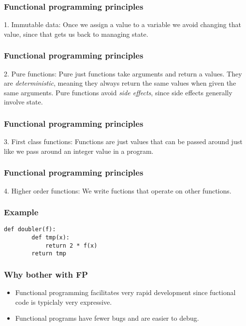 \documentclass[10pt]{beamer}
\begin{document}
\begin{frame}
  \frametitle{Functional programming principles}

   1.  Immutable data:  Once we assign a value to a variable we avoid 
   changing that value, since that gets us back to managing state.
\end{frame}
\begin{frame}
  \frametitle{Functional programming principles}

   2. Pure functions:  Pure just functions take arguments and return a values. 
   They are \emph{deterministic}, meaning they always return the same values when 
   given the same arguments.  Pure functions avoid \emph{side effects}, since
   side effects generally involve state.
\end{frame}
\begin{frame}
  \frametitle{Functional programming principles}

   3.  First class functions: Functions are just values that can be passed around 
   just like we pass around an integer value in a program.
\end{frame}
\begin{frame}
  \frametitle{Functional programming principles}

   4.  Higher order functions: We write fuctions that operate on other 
   functions.
\end{frame}
\begin{frame}[fragile]
  \frametitle{Example}

 
\begin{Verbatim}[commandchars=\\\[\]]
    def doubler(f):
        def tmp(x):
            return 2 * f(x)
        return tmp
\end{Verbatim}

\end{frame}
\begin{frame}
  \frametitle{Why bother with FP}

  \begin{itemize}
	  \item Functional programming facilitates very rapid development
		  since fuctional code is typiclaly very expressive.
	  \item Functional programs have fewer bugs and are easier to debug.
  \end{itemize}
\end{frame}
\end{document}
